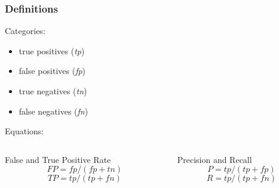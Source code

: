 \documentclass{beamer}
\begin{document}
\begin{frame}
\frametitle[Definitions]{Definitions}
\begin{center}
Categories:
\end{center}
{\footnotesize
\begin{itemize}
\item true positives (\textit{tp})
\item false positives (\textit{fp})
\item true negatives (\textit{tn})
\item false negatives (\textit{fn})
\end{itemize}
}
\begin{center}
Equations:
\end{center}
\begin{columns}
\begin{column}{0.5\textwidth}
{\footnotesize
False and True Positive Rate
\begin{equation*}
FP = fp / (fp + tn)
\end{equation*}
\begin{equation*}
TP = tp / (tp + fn)
\end{equation*}
}
\end{column}
\begin{column}{0.5\textwidth}
{\footnotesize
Precision and Recall
\begin{equation*}
P = tp / (tp + fp)
\end{equation*}
\begin{equation*}
R = tp / (tp + fn)
\end{equation*}
}
\end{column}
\end{columns}
\end{frame}
\end{document}
